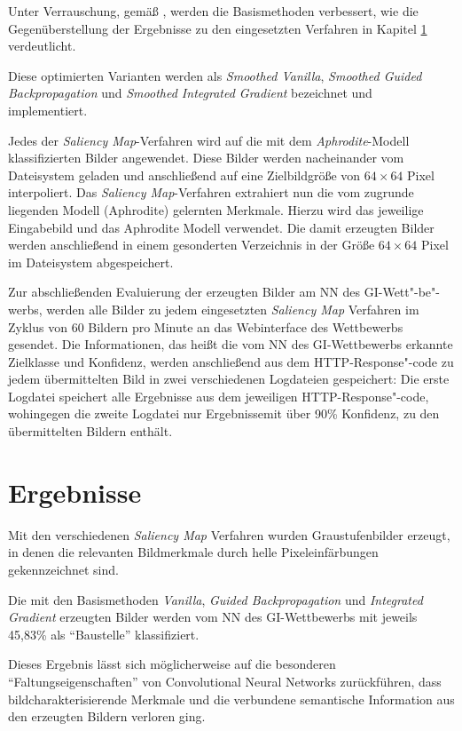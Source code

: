 Unter Verrauschung, gemäß \cite{smilkov_smoothgrad:_2017}, werden die Basismethoden verbessert, wie die Gegenüberstellung der Ergebnisse zu den eingesetzten Verfahren in Kapitel \ref{sec:SalErgebnisse} verdeutlicht.

Diese optimierten Varianten werden als \textit{Smoothed Vanilla}, \textit{Smoothed Guided Backpropagation} und \textit{Smoothed Integrated Gradient} bezeichnet und implementiert.

Jedes der \textit{Saliency Map}-Verfahren wird auf die mit dem \textit{Aphrodite}-Modell klassifizierten Bilder angewendet.
Diese Bilder werden nacheinander vom Dateisystem geladen und anschließend auf eine Zielbildgröße von $64 \times 64 $ Pixel interpoliert. 
Das \textit{Saliency Map}-Verfahren extrahiert nun die vom zugrunde liegenden Modell (Aphrodite) gelernten Merkmale. 
Hierzu wird das jeweilige Eingabebild und das Aphrodite Modell verwendet. 
Die damit erzeugten Bilder werden anschließend in einem gesonderten Verzeichnis in der Größe $64 \times 64 $ Pixel im Dateisystem abgespeichert.


Zur abschließenden Evaluierung der erzeugten Bilder am \ac{NN} des \ac{GI}-Wett"-be"-werbs, werden alle Bilder zu jedem eingesetzten \textit{Saliency Map} Verfahren im Zyklus von 60 Bildern pro Minute an das Webinterface des Wettbewerbs gesendet. 
Die Informationen, das heißt die vom \ac{NN} des \ac{GI}-Wettbewerbs erkannte Zielklasse und Konfidenz, werden anschließend aus dem HTTP-Response"-code zu jedem übermittelten Bild in zwei verschiedenen Logdateien gespeichert: 
Die erste Logdatei speichert alle Ergebnisse aus dem jeweiligen HTTP-Response"-code, wohingegen die zweite Logdatei nur Ergebnissemit über 90\% Konfidenz, zu den übermittelten Bildern enthält.

\section{Ergebnisse}
\label{sec:SalErgebnisse}
Mit den verschiedenen \textit{Saliency Map} Verfahren wurden Graustufenbilder erzeugt, in denen die relevanten Bildmerkmale durch helle Pixeleinfärbungen gekennzeichnet sind. 

Die mit den Basismethoden \textit{Vanilla}, \textit{Guided Backpropagation} und \textit{Integrated Gradient} erzeugten Bilder werden vom \ac{NN} des \ac{GI}-Wettbewerbs mit jeweils 45,83\% als "`Baustelle"' klassifiziert.

Dieses Ergebnis lässt sich möglicherweise auf die besonderen "`Faltungseigenschaften"' von Convolutional Neural Networks zurückführen, dass bildcharakterisierende Merkmale und die verbundene semantische Information aus den erzeugten Bildern verloren ging.

